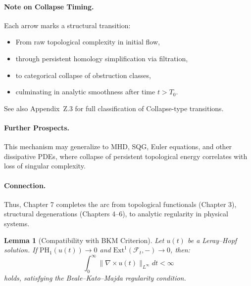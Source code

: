 \documentclass[11pt]{article}
\newtheorem{lemma}[theorem]{Lemma}
\begin{document}
\paragraph{Note on Collapse Timing.}
Each arrow marks a structural transition:
\begin{itemize}
  \item From raw topological complexity in initial flow,
  \item through persistent homology simplification via filtration,
  \item to categorical collapse of obstruction classes,
  \item culminating in analytic smoothness after time \( t > T_0 \).
\end{itemize}

See also Appendix~Z.3 for full classification of Collapse-type transitions.

\begin{center}

\vspace{0.5em}
\end{center}

\paragraph{Further Prospects.}
This mechanism may generalize to MHD, SQG, Euler equations, and other dissipative PDEs, where collapse of persistent topological energy correlates with loss of singular complexity.

\paragraph{Connection.}
Thus, Chapter 7 completes the arc from topological functionals (Chapter 3), structural degenerations (Chapters 4–6), to analytic regularity in physical systems.

\begin{lemma}[Compatibility with BKM Criterion]
Let $u(t)$ be a Leray--Hopf solution. If $\mathrm{PH}_1(u(t)) \to 0$ and $\mathrm{Ext}^1(\mathcal{F}_t, -) \to 0$, then:
\[
\int_0^\infty \|\nabla \times u(t)\|_{L^\infty} dt < \infty
\]
holds, satisfying the Beale–Kato–Majda regularity condition.
\end{lemma}
\end{document}
